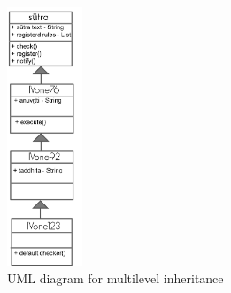 \documentclass[11pt]{article}
\begin{document}
\begin{figure}[h]
    \centering
	\includegraphics[width=0.2\textwidth]{UMLinher}
    \caption{UML diagram for multilevel inheritance}
    \label{fig:UMLinher}
\end{figure}


\\
\end{document}
